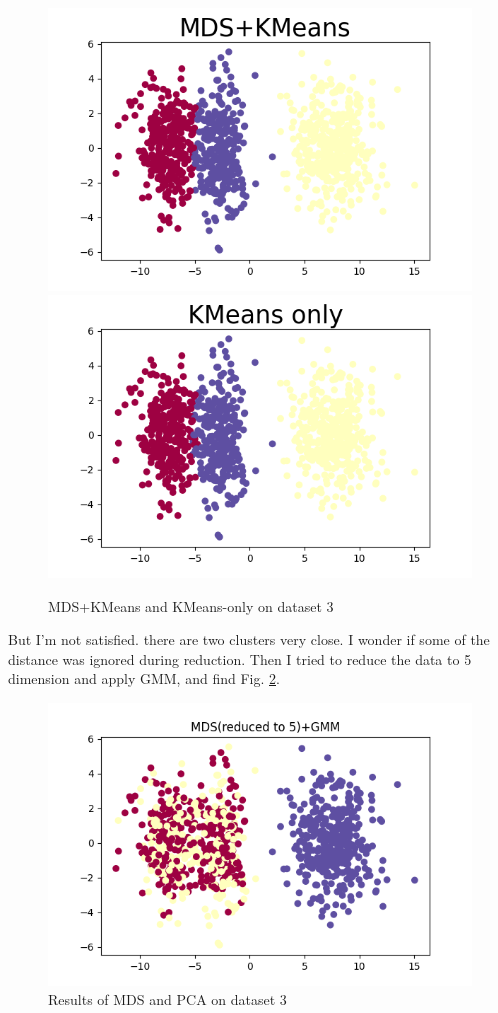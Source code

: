 \documentclass[conference]{IEEEtran}
\begin{document}
\begin{figure}[htbp]
	{\includegraphics[scale=0.28]{P3MK2.png}}
	{\includegraphics[scale=0.28]{p3K.png}}
	\caption{MDS+KMeans and KMeans-only on dataset 3}
	\label{DRCMP}
\end{figure}

But I'm not satisfied. there are two clusters very close. I wonder if some of the distance was ignored during reduction. Then I tried to reduce the data to 5 dimension and apply GMM, and find Fig. \ref{P3MG5}.

\begin{figure}[htbp]
	\centerline{\includegraphics[scale=0.5]{P3MG5.png}}
	\caption{Results of MDS and PCA on dataset 3}
	\label{P3MG5}
\end{figure}
\end{document}
